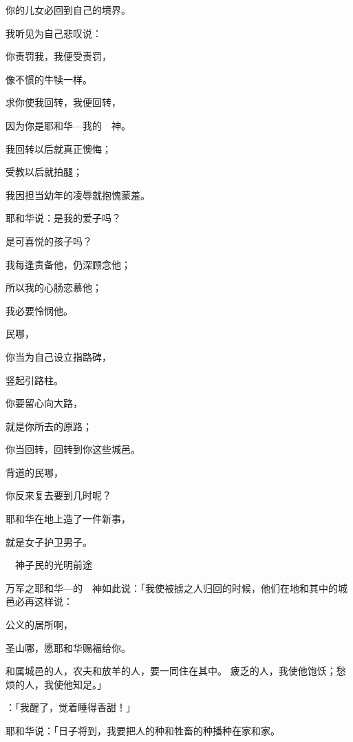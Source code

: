 {\par }{\Q 你的儿女必回到自己的境界。
\par }{\Q {}我听见{}为自己悲叹说：
\par }{\Q 你责罚我，我便受责罚，
\par }{\Q 像不惯{}的牛犊一样。
\par }{\Q 求你使我回转，我便回转，
\par }{\Q 因为你是耶和华—我的　神。
\par }{\Q {}我回转以后就真正懊悔；
\par }{\Q 受教以后就拍腿{}；
\par }{\Q 我因担当幼年的凌辱就抱愧蒙羞。
\par }{\Q {}耶和华说：{}是我的爱子吗？
\par }{\Q 是可喜悦的孩子吗？
\par }{\Q 我每逢责备他，仍深顾念他；
\par }{\Q 所以我的心肠恋慕他；
\par }{\Q 我必要怜悯他。
\par }{\BB \par }{\Q {}民哪，
\par }{\Q 你当为自己设立指路碑，
\par }{\Q 竖起引路柱。
\par }{\Q 你要留心向大路，
\par }{\Q 就是你所去的原路；
\par }{\Q 你当回转，回转到你这些城邑。
\par }{\Q {}背道的民哪，
\par }{\Q 你反来复去要到几时呢？
\par }{\Q 耶和华在地上造了一件新事，
\par }{\Q 就是女子护卫男子。
\par }{\SH 　神子民的光明前途
\par }{\PP {}万军之耶和华—{}的　神如此说：「我使被掳之人归回的时候，他们在{}地和其中的城邑必再这样说：
\par }{\Q 公义的居所啊，
\par }{\Q 圣山哪，愿耶和华赐福给你。
\par }{\PP {}和属{}城邑的人，农夫和放羊的人，要一同住在其中。
疲乏的人，我使他饱饫；愁烦的人，我使他知足。」
\par }{\PP {}：「我醒了，觉着睡得香甜！」
\par }{\PP {}耶和华说：「日子将到，我要把人的种和牲畜的种播种在{}家和{}家。
}
